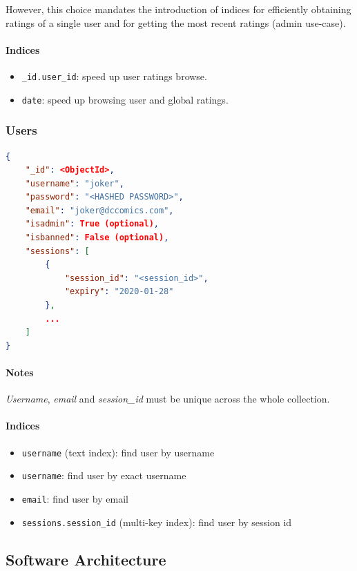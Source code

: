 \documentclass[11pt]{article}
\begin{document}
However, this choice mandates the introduction of indices for efficiently 
obtaining ratings of a single user and for getting the most recent ratings (admin use-case).

\paragraph{Indices} 
\begin{itemize}
	\item \texttt{\_id.user\_id}: speed up user ratings browse.
	\item \texttt{date}: speed up browsing user and global ratings.
\end{itemize}

\subsubsection{Users}
\label{sec:users}

\begin{lstlisting}[language=json]	
{
	"_id": <ObjectId>,
	"username": "joker",
	"password": "<HASHED PASSWORD>",
	"email": "joker@dccomics.com",
	"isadmin": True (optional),
	"isbanned": False (optional),
	"sessions": [
		{
			"session_id": "<session_id>",
			"expiry": "2020-01-28"
		},
		...
	]
}
\end{lstlisting}
\paragraph{Notes}
\emph{Username}, \emph{email} and \emph{session\_id} must be unique across the whole collection.

\paragraph{Indices} 
\begin{itemize}
	\item \texttt{username} (text index): find user by username
	\item \texttt{username}: find user by exact username
	\item \texttt{email}: find user by email
	\item \texttt{sessions.session\_id} (multi-key index): find user by session id
\end{itemize}

\subsection{Software Architecture}
\end{document}
